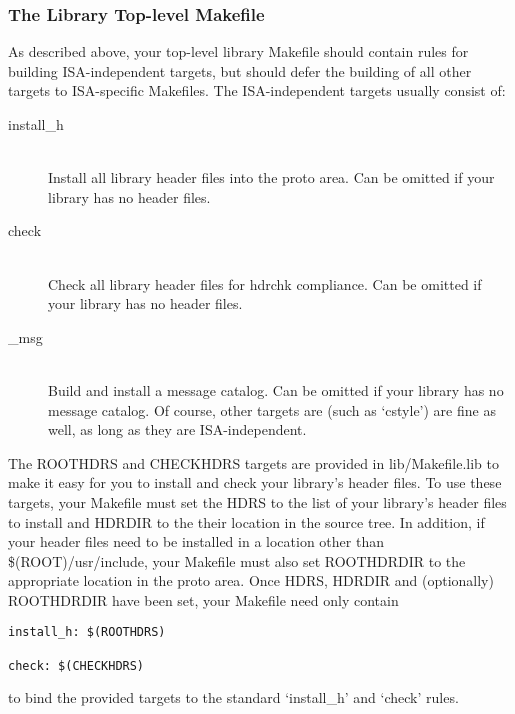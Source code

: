 \documentclass{article}
\begin{document}
\subsubsection*{The Library Top-level Makefile}

As described above, your top-level library Makefile should contain rules for
building ISA-independent targets, but should defer the building of all other
targets to ISA-specific Makefiles. The ISA-independent targets usually consist
of:

\begin{description}

\item[install\_h] \hfill \\
  Install all library header files into the proto area. Can be omitted if your
  library has no header files.

\item[check] \hfill \\
  Check all library header files for hdrchk compliance. Can be omitted if your
  library has no header files.

\item[\_msg] \hfill \\
  Build and install a message catalog. Can be omitted if your library has no
  message catalog. Of course, other targets are (such as `cstyle') are fine as
  well, as long as they are ISA-independent.

\end{description}

The ROOTHDRS and CHECKHDRS targets are provided in lib/Makefile.lib to make it
easy for you to install and check your library's header files. To use these
targets, your Makefile must set the HDRS to the list of your library's header
files to install and HDRDIR to the their location in the source tree. In
addition, if your header files need to be installed in a location other than
\$(ROOT)/usr/include, your Makefile must also set ROOTHDRDIR to the appropriate
location in the proto area. Once HDRS, HDRDIR and (optionally) ROOTHDRDIR have
been set, your Makefile need only contain

\begin{verbatim}
install_h: $(ROOTHDRS)

check: $(CHECKHDRS)
\end{verbatim}

\vspace{0.1cm}
to bind the provided targets to the standard `install\_h' and `check' rules.
\end{document}
